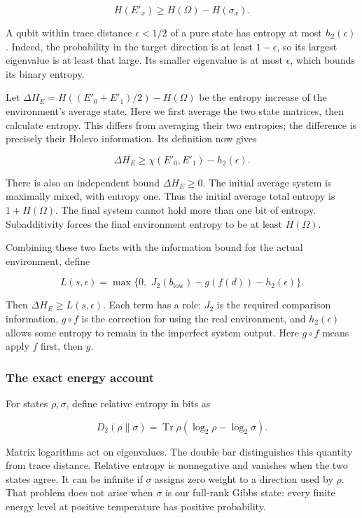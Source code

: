 \documentclass[11pt,letterpaper]{article}
\begin{document}
\[H\left( E\prime_{x} \right) \geq H(\Omega) - H\left( \sigma_{x} \right).\]

A qubit within trace distance \(\epsilon < 1/2\) of a pure state has entropy at most \(h_{2}(\epsilon)\). Indeed, the probability in the target direction is at least \(1 - \epsilon\), so its largest eigenvalue is at least that large. Its smaller eigenvalue is at most \(\epsilon\), which bounds its binary entropy.

Let \(\Delta H_{E} = H\left( \left( E\prime_{0} + E\prime_{1} \right)/2 \right) - H(\Omega)\) be the entropy increase of the environment's average state. Here we first average the two state matrices, then calculate entropy. This differs from averaging their two entropies; the difference is precisely their Holevo information. Its definition now gives

\[\Delta H_{E} \geq \chi\left( E\prime_{0},E\prime_{1} \right) - h_{2}(\epsilon).\]

There is also an independent bound \(\Delta H_{E} \geq 0\). The initial average system is maximally mixed, with entropy one. Thus the initial average total entropy is \(1 + H(\Omega)\). The final system cannot hold more than one bit of entropy. Subadditivity forces the final environment entropy to be at least \(H(\Omega)\).

Combining these two facts with the information bound for the actual environment, define

\[L(s,\epsilon) = \max\{ 0,\mspace{6mu} J_{2}\left( b_{\mathrm{low}} \right) - g\left( f(d) \right) - h_{2}(\epsilon)\}.\]

Then \(\Delta H_{E} \geq L(s,\epsilon)\). Each term has a role: \(J_{2}\) is the required comparison information, \(g \circ f\) is the correction for using the real environment, and \(h_{2}(\epsilon)\) allows some entropy to remain in the imperfect system output. Here \(g \circ f\) means apply \(f\) first, then \(g\).

\subsubsection{The exact energy account}\label{the-exact-energy-account}

For states \(\rho,\sigma\), define relative entropy in bits as

\[D_{2}\left( \rho\|\sigma \right) = \operatorname{Tr}\rho\left( \log_{2}\rho - \log_{2}\sigma \right).\]

Matrix logarithms act on eigenvalues. The double bar distinguishes this quantity from trace distance. Relative entropy is nonnegative and vanishes when the two states agree. It can be infinite if \(\sigma\) assigns zero weight to a direction used by \(\rho\). That problem does not arise when \(\sigma\) is our full-rank Gibbs state: every finite energy level at positive temperature has positive probability.
\end{document}
